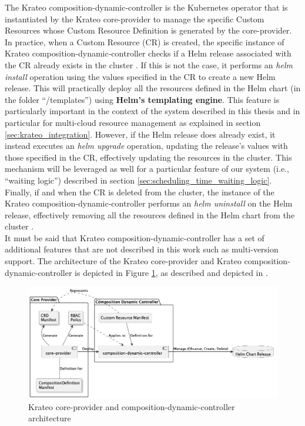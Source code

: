 The Krateo composition-dynamic-controller is the Kubernetes operator that is instantiated by the Krateo core-provider to manage the specific Custom Resources whose Custom Resource Definition is generated by the core-provider.
In practice, when a Custom Resource (CR) is created, the specific instance of Krateo composition-dynamic-controller checks if a Helm release associated with the CR already exists in the cluster \cite{krateo_composition_dynamic_controller}. 
If this is not the case, it performs an \textit{helm install} operation using the values specified in the CR to create a new Helm release. 
This will practically deploy all the resources defined in the Helm chart (in the folder ``/templates'') using \textbf{Helm's templating engine}.
This feature is particularly important in the context of the system described in this thesis and in particular for multi-cloud resource management as explained in section \ref{sec:krateo_integration}.
However, if the Helm release does already exist, it instead executes an \textit{helm upgrade} operation, updating the release's values with those specified in the CR, effectively updating the resources in the cluster.
This mechanism will be leveraged as well for a particular feature  of our system (i.e., ``waiting logic'') described in section \ref{sec:scheduling_time_waiting_logic}.
Finally, if and when the CR is deleted from the cluster, the instance of the Krateo composition-dynamic-controller performs an \textit{helm uninstall} on the Helm release, effectively removing all the resources defined in the Helm chart from the cluster \cite{krateo_composition_dynamic_controller}. \\
It must be said that Krateo composition-dynamic-controller has a set of additional features that are not described in this work such as multi-version support.
The architecture of the Krateo core-provider and Krateo composition-dynamic-controller is depicted in Figure \ref{fig:krateo_core_provider}, as described and depicted in \cite{krateo_core_provider}.

\begin{figure}[htb]
    \centering
    \includegraphics[width=1\linewidth]{images/kraeto_core_provider.png}
    \caption{Krateo core-provider and composition-dynamic-controller architecture \cite{krateo_core_provider}}
    \label{fig:krateo_core_provider}
\end{figure}


